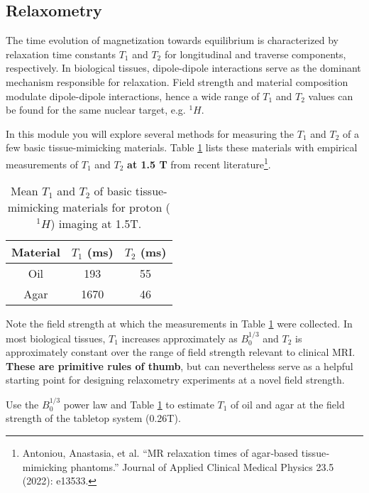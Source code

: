 \newpage
\subsection{Relaxometry} \label{sec:relax}

The time evolution of magnetization towards equilibrium is characterized by relaxation time constants $T_1$ and $T_2$ for longitudinal and traverse components, respectively. In biological tissues, dipole-dipole interactions serve as the dominant mechanism responsible for relaxation. Field strength and material composition modulate dipole-dipole interactions, hence a wide range of $T_1$ and $T_2$ values can be found for the same nuclear target, e.g. ${}^1 H$.

In this module you will explore several methods for measuring the $T_1$ and $T_2$ of a few basic tissue-mimicking materials. Table \ref{table:relax} lists these materials with empirical measurements of $T_1$ and $T_2$ \textbf{at 1.5 T} from recent literature\footnote{Antoniou, Anastasia, et al. ``MR relaxation times of agar‐based tissue‐mimicking phantoms.'' Journal of Applied Clinical Medical Physics 23.5 (2022): e13533.}.

\begin{table}[!h]
\begin{center}
\begin{tabular}{ |c|c|c| } 
\hline
\textbf{Material} & \textbf{$T_1$ (ms)} & \textbf{$T_2$ (ms)} \\ \hline
Oil & 193 & 55 \\ \hline
Agar & 1670 & 46 \\ \hline
\end{tabular}
\end{center}
\caption{\label{table:relax} Mean $T_1$ and $T_2$ of basic tissue-mimicking materials for proton (${}^1 H$) imaging at 1.5T.}
\end{table}

Note the field strength at which the measurements in Table \ref{table:relax} were collected. In most biological tissues, $T_1$ increases approximately as $B_0^{1/3}$ and $T_2$ is approximately constant over the range of field strength relevant to clinical MRI. \textbf{These are primitive rules of thumb}, but can nevertheless serve as a helpful starting point for designing relaxometry experiments at a novel field strength.

\vspace{5mm}

\color{red} Use the $B_0^{1/3}$ power law and Table \ref{table:relax} to estimate $T_1$ of oil and agar at the field strength of the tabletop system (0.26T).
\color{black}

